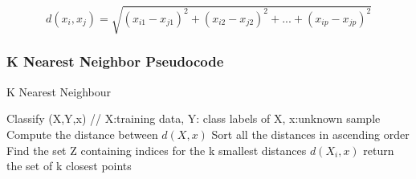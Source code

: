 \documentclass{report}
\begin{document}
\begin{equation}
d(x_{i},x_{j}) = \sqrt{(x_{i1} - x_{j1})^2 + (x_{i2} - x_{j2})^2 + ... + (x_{ip} - x_{jp})^2}
\end{equation}

\subsubsection{K Nearest Neighbor Pseudocode }
\begin{algorithm}
  \caption{K Nearest Neighbour}
  \begin{algorithmic}
  	\State Classify (X,Y,x) // X:training data, Y: class labels of X, x:unknown sample
	\State Compute the distance between $d(X, x)$
	\State Sort all the distances in ascending order
	\EndFor
	\State Find the set Z containing indices for the k smallest distances $d(X_{i},x)$
	\State return the set of k closest points 
  \end{algorithmic}
\end{algorithm}



\end{document}
